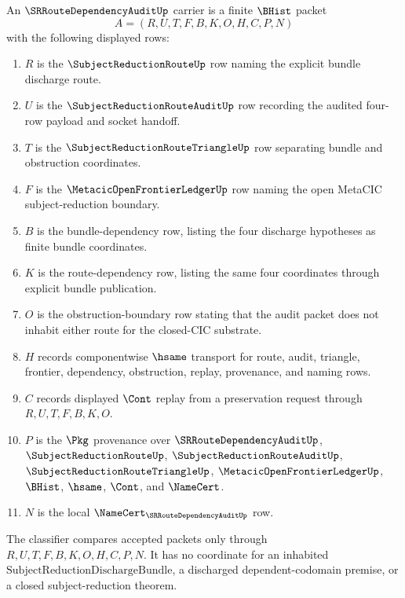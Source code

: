 \begin{definition}
\label{def:sr-route-dependency-audit-carrier}
An $\SRRouteDependencyAuditUp$ carrier is a finite $\BHist$ packet
$$
A=(R,U,T,F,B,K,O,H,C,P,N)
$$
with the following displayed rows:
\begin{enumerate}
\item $R$ is the $\SubjectReductionRouteUp$ row naming the explicit bundle discharge route.
\item $U$ is the $\SubjectReductionRouteAuditUp$ row recording the audited four-row payload and socket handoff.
\item $T$ is the $\SubjectReductionRouteTriangleUp$ row separating bundle and obstruction coordinates.
\item $F$ is the $\MetacicOpenFrontierLedgerUp$ row naming the open MetaCIC subject-reduction boundary.
\item $B$ is the bundle-dependency row, listing the four discharge hypotheses as finite bundle coordinates.
\item $K$ is the route-dependency row, listing the same four coordinates through explicit bundle publication.
\item $O$ is the obstruction-boundary row stating that the audit packet does not inhabit either route for the closed-CIC substrate.
\item $H$ records componentwise $\hsame$ transport for route, audit, triangle, frontier, dependency, obstruction, replay, provenance, and naming rows.
\item $C$ records displayed $\Cont$ replay from a preservation request through $R,U,T,F,B,K,O$.
\item $P$ is the $\Pkg$ provenance over $\SRRouteDependencyAuditUp$, $\SubjectReductionRouteUp$, $\SubjectReductionRouteAuditUp$, $\SubjectReductionRouteTriangleUp$, $\MetacicOpenFrontierLedgerUp$, $\BHist$, $\hsame$, $\Cont$, and $\NameCert$.
\item $N$ is the local $\NameCert_{\SRRouteDependencyAuditUp}$ row.
\end{enumerate}
The classifier compares accepted packets only through $R,U,T,F,B,K,O,H,C,P,N$. It has no coordinate for an inhabited $\mathrm{SubjectReductionDischargeBundle}$, a discharged dependent-codomain premise, or a closed subject-reduction theorem.
\end{definition}

